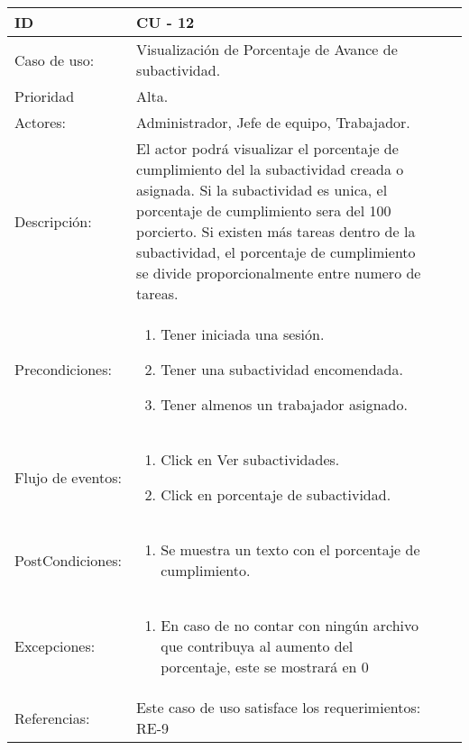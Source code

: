 \documentclass[11pt,a4paper]{article}
\begin{document}
\begin{tabular}[c]{|p{3cm}|p{13cm}|p{2.5cm}|p{3cm}|}
\hline 
\rule[-1ex]{0pt}{2.5ex} ID & CU - 12 \\ 
\hline 
\rule[-1ex]{0pt}{2.5ex} Caso de uso: & Visualización de Porcentaje de Avance de subactividad. \\ 
\hline 
\rule[-1ex]{0pt}{2.5ex} Prioridad & Alta. \\ 
\hline 
\rule[-1ex]{0pt}{2.5ex} Actores: & Administrador, Jefe de equipo, Trabajador.\\ 
\hline 
\rule[-1ex]{0pt}{2.5ex} Descripción: & El actor podrá visualizar el porcentaje de cumplimiento del
la subactividad creada o asignada.
Si la subactividad es unica, el porcentaje de cumplimiento sera del 100 porcierto. Si existen más tareas dentro de la subactividad, el porcentaje de cumplimiento
se divide proporcionalmente entre numero de tareas. \\ 
\hline 
\rule[-1ex]{0pt}{2.5ex}Precondiciones: & \begin{enumerate}
\item Tener iniciada una sesión.
\item Tener una subactividad encomendada.
\item Tener almenos un trabajador asignado.
\end{enumerate} \\ 
\hline 
\rule[-1ex]{0pt}{2.5ex} Flujo de eventos: & \begin{enumerate} 
\item Click en Ver subactividades.
\item Click en porcentaje de subactividad.
\end{enumerate}
\\ 
\hline 
\rule[-1ex]{0pt}{2.5ex} PostCondiciones:& \begin{enumerate}  
\item Se muestra un texto con el porcentaje de cumplimiento.
\end{enumerate} \\ 
\hline 
\rule[-1ex]{0pt}{2.5ex} Excepciones: & \begin{enumerate} 
\item En caso de no contar con ningún archivo que contribuya al aumento del porcentaje, este se mostrará en 0%
\end{enumerate} \\ 
\hline 
\rule[-1ex]{0pt}{2.5ex} Referencias: & Este caso de uso satisface los requerimientos: RE-9\\
\hline 

\end{tabular} 
\end{document}
